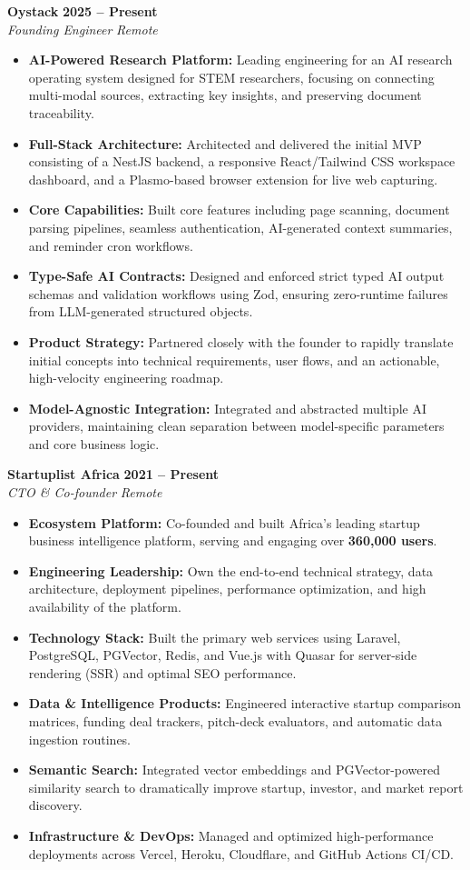 \documentclass[10pt,a4paper]{article}
\newcommand{\jobheader}[4]{%
  \noindent%
  \textbf{\large #1} \hfill \textcolor{secondary}{\textbf{#2}} \\%
  \textit{\textcolor{accent}{#3}} \hfill \textit{\small\textcolor{secondary}{#4}}%
  \vspace{3pt}%
}
\begin{document}
\jobheader{Oystack}{2025 -- Present}{Founding Engineer}{Remote}
\begin{itemize}
  \item \textbf{AI-Powered Research Platform:} Leading engineering for an AI research operating system designed for STEM researchers, focusing on connecting multi-modal sources, extracting key insights, and preserving document traceability.
  \item \textbf{Full-Stack Architecture:} Architected and delivered the initial MVP consisting of a NestJS backend, a responsive React/Tailwind CSS workspace dashboard, and a Plasmo-based browser extension for live web capturing.
  \item \textbf{Core Capabilities:} Built core features including page scanning, document parsing pipelines, seamless authentication, AI-generated context summaries, and reminder cron workflows.
  \item \textbf{Type-Safe AI Contracts:} Designed and enforced strict typed AI output schemas and validation workflows using Zod, ensuring zero-runtime failures from LLM-generated structured objects.
  \item \textbf{Product Strategy:} Partnered closely with the founder to rapidly translate initial concepts into technical requirements, user flows, and an actionable, high-velocity engineering roadmap.
  \item \textbf{Model-Agnostic Integration:} Integrated and abstracted multiple AI providers, maintaining clean separation between model-specific parameters and core business logic.
\end{itemize}

\jobheader{Startuplist Africa}{2021 -- Present}{CTO \& Co-founder}{Remote}
\begin{itemize}
  \item \textbf{Ecosystem Platform:} Co-founded and built Africa’s leading startup business intelligence platform, serving and engaging over \textbf{360,000 users}.
  \item \textbf{Engineering Leadership:} Own the end-to-end technical strategy, data architecture, deployment pipelines, performance optimization, and high availability of the platform.
  \item \textbf{Technology Stack:} Built the primary web services using Laravel, PostgreSQL, PGVector, Redis, and Vue.js with Quasar for server-side rendering (SSR) and optimal SEO performance.
  \item \textbf{Data \& Intelligence Products:} Engineered interactive startup comparison matrices, funding deal trackers, pitch-deck evaluators, and automatic data ingestion routines.
  \item \textbf{Semantic Search:} Integrated vector embeddings and PGVector-powered similarity search to dramatically improve startup, investor, and market report discovery.
  \item \textbf{Infrastructure \& DevOps:} Managed and optimized high-performance deployments across Vercel, Heroku, Cloudflare, and GitHub Actions CI/CD.
\end{itemize}
\end{document}
